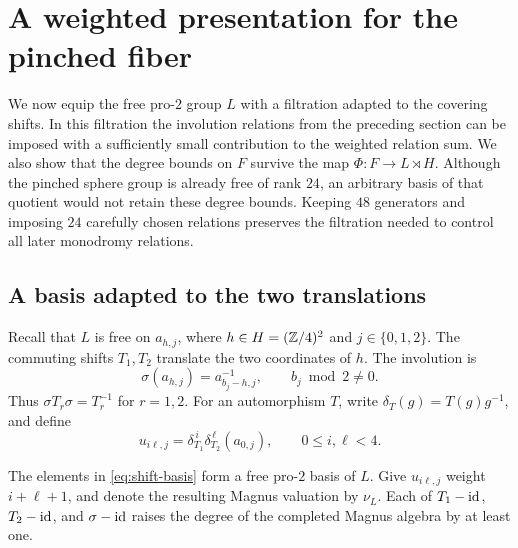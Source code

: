 \section{A weighted presentation for the pinched fiber}
\label{sec:involution}

We now equip the free pro-\(2\) group \(L\) with a filtration adapted to
the covering shifts.  In this filtration the involution relations from
the preceding section can be imposed with a sufficiently small contribution to the weighted
relation sum.  We also show that the degree bounds on \(F\) survive the map
\(\Phi:F\to L\rtimes H\). Although the pinched sphere group is
already free of rank $24$, an arbitrary basis of that quotient would
not retain these degree bounds. Keeping $48$ generators and imposing
$24$ carefully chosen relations preserves the filtration needed to
control all later monodromy relations.

\subsection{A basis adapted to the two translations}

Recall that \(L\) is free on \(a_{h,j}\), where
\(h\in H=(\mathbb Z/4)^2\) and \(j\in\{0,1,2\}\).  The commuting shifts
\(T_1,T_2\) translate the two coordinates of \(h\).  The involution is
\[
 \sigma(a_{h,j})=a_{b_j-h,j}^{-1},
 \qquad b_j\bmod 2\ne0.
\]
Thus \(\sigma T_r\sigma=T_r^{-1}\) for \(r=1,2\).
For an automorphism \(T\), write
\(\delta_T(g)=T(g)g^{-1}\), and define
\begin{equation}\label{eq:shift-basis}
 u_{i\ell,j}=\delta_{T_1}^{\,i}\delta_{T_2}^{\,\ell}(a_{0,j}),
 \qquad 0\le i,\ell<4.
\end{equation}

\begin{lemma}\label{lem:shift-basis}
The elements in \eqref{eq:shift-basis} form a free pro-\(2\) basis of
\(L\).  Give \(u_{i\ell,j}\) weight \(i+\ell+1\), and denote the
resulting Magnus valuation by \(\nu_L\).  Each of
\(T_1-\operatorname{id}\), \(T_2-\operatorname{id}\), and \(\sigma-\operatorname{id}\) raises the degree of the
completed Magnus algebra by at least one.
\end{lemma}


